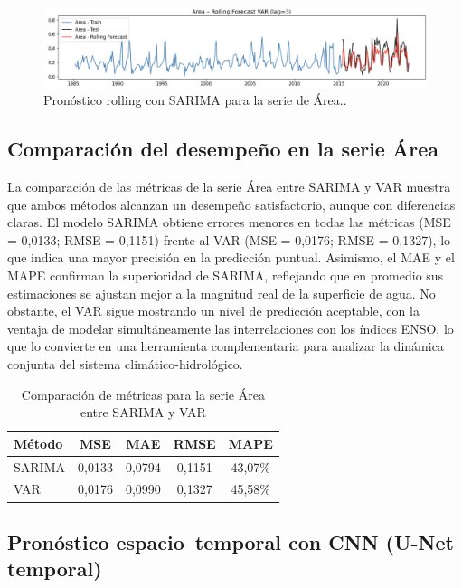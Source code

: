 \begin{figure}[H]
    \centering
    \includegraphics[scale=0.30]{Figures/rolling_var.png}
    \caption{Pronóstico rolling con SARIMA para la serie de Área..}
    \label{fig:rolling_var}
\end{figure}

\subsection{Comparación del desempeño en la serie Área}
La comparación de las métricas de la serie Área entre SARIMA y VAR muestra que ambos métodos alcanzan un desempeño satisfactorio, aunque con diferencias claras. El modelo SARIMA obtiene errores menores en todas las métricas (MSE = 0,0133; RMSE = 0,1151) frente al VAR (MSE = 0,0176; RMSE = 0,1327), lo que indica una mayor precisión en la predicción puntual. Asimismo, el MAE y el MAPE confirman la superioridad de SARIMA, reflejando que en promedio sus estimaciones se ajustan mejor a la magnitud real de la superficie de agua. No obstante, el VAR sigue mostrando un nivel de predicción aceptable, con la ventaja de modelar simultáneamente las interrelaciones con los índices ENSO, lo que lo convierte en una herramienta complementaria para analizar la dinámica conjunta del sistema climático-hidrológico.
\begin{table}[H]
    \centering
    \caption{Comparación de métricas para la serie Área entre SARIMA y VAR}
    \label{tab:comp_area}
    \begin{tabular}{lcccc}
        \toprule
        Método & MSE & MAE & RMSE & MAPE \\
        \midrule
        SARIMA & 0,0133 & 0,0794 & 0,1151 & 43,07\% \\
        VAR    & 0,0176 & 0,0990 & 0,1327 & 45,58\% \\
        \bottomrule
    \end{tabular}
\end{table}


\subsection{Pronóstico espacio–temporal con CNN (U-Net temporal)}

